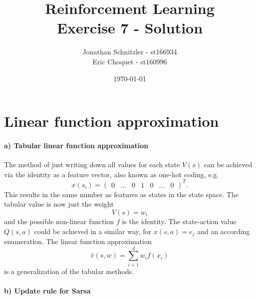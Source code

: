 \documentclass{article}
\title{Reinforcement Learning \\ Exercise 7 - Solution}
\author{Jonathan Schnitzler - st166934 \\
Eric Choquet - st160996}
\date{\today}
\begin{document}
\maketitle

\section{Linear function approximation}

\paragraph*{a)  Tabular linear function approximation}

The method of just writing down all values for each state $V(s)$ can be achieved via the identity as a feature vector, also known as one-hot coding, e.g.
\begin{equation}
    x(s_i) = \begin{pmatrix}
        0 & \hdots & 0 & 1 & 0 & \hdots & 0
    \end{pmatrix}^T.
\end{equation}
This results in the same number as features as states in the state space. The tabular value is now just the weight
\begin{equation}
    V(s) = w_i
\end{equation} and the possible non-linear function $f$ is the identity. The state-action value $Q(s, a)$ could be achieved in a similar way, for $x(s, a) = e_j$ and an according enumeration. The linear function approximation
$$\hat{v}(s,w) = \sum_{i=1}^d w_i f(x_i)$$
is a generalization of the tabular methods.

\paragraph*{b) Update rule for Sarsa}
\end{document}
